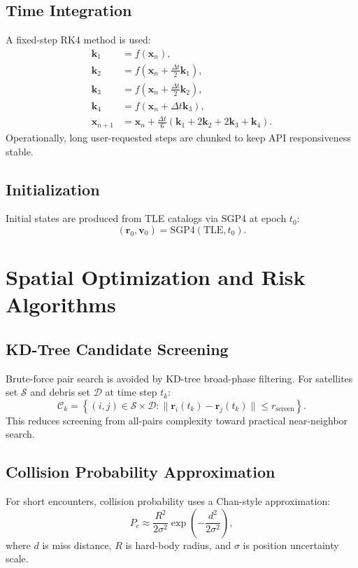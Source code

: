 \documentclass[11pt,a4paper]{article}
\begin{document}
\subsection{Time Integration}
A fixed-step RK4 method is used:
\begin{align*}
\mathbf{k}_1 &= f(\mathbf{x}_n), \\
\mathbf{k}_2 &= f\left(\mathbf{x}_n + \frac{\Delta t}{2}\mathbf{k}_1\right), \\
\mathbf{k}_3 &= f\left(\mathbf{x}_n + \frac{\Delta t}{2}\mathbf{k}_2\right), \\
\mathbf{k}_4 &= f\left(\mathbf{x}_n + \Delta t\mathbf{k}_3\right), \\
\mathbf{x}_{n+1} &= \mathbf{x}_n + \frac{\Delta t}{6}(\mathbf{k}_1 + 2\mathbf{k}_2 + 2\mathbf{k}_3 + \mathbf{k}_4).
\end{align*}
Operationally, long user-requested steps are chunked to keep API responsiveness stable.

\subsection{Initialization}
Initial states are produced from TLE catalogs via SGP4 at epoch $t_0$:
\[
(\mathbf{r}_0,\mathbf{v}_0)=\mathrm{SGP4}(\mathrm{TLE},t_0).
\]

\section{Spatial Optimization and Risk Algorithms}
\subsection{KD-Tree Candidate Screening}
Brute-force pair search is avoided by KD-tree broad-phase filtering. For satellites set $\mathcal{S}$ and debris set $\mathcal{D}$ at time step $t_k$:
\[
\mathcal{C}_k = \left\{(i,j)\in\mathcal{S}\times\mathcal{D}:\|\mathbf{r}_i(t_k)-\mathbf{r}_j(t_k)\|\le r_{\mathrm{screen}}\right\}.
\]
This reduces screening from all-pairs complexity toward practical near-neighbor search.

\subsection{Collision Probability Approximation}
For short encounters, collision probability uses a Chan-style approximation:
\[
P_c \approx \frac{R^2}{2\sigma^2}\exp\left(-\frac{d^2}{2\sigma^2}\right),
\]
where $d$ is miss distance, $R$ is hard-body radius, and $\sigma$ is position uncertainty scale.
\end{document}
